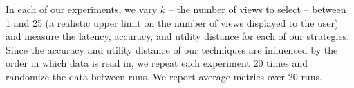 


In each of our experiments, we vary $k$ -- the number of views to select -- between
1 and 25 (a realistic upper limit on the number of views displayed to the user)
and measure the latency, accuracy, and utility distance for each of our
strategies. 
Since the accuracy and utility distance of our techniques are influenced by the
order in which data is read in, we repeat each experiment 20
times and randomize the data between runs. We report average
metrics over 20 runs.








